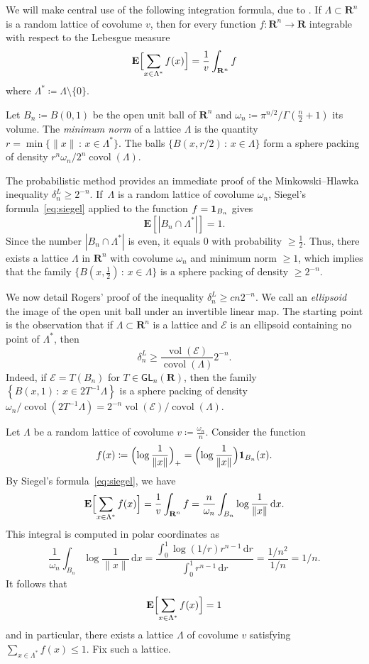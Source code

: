 \documentclass[10pt,a4paper]{amsart}
\newcommand{\R}{\mathbf{R}}
\newcommand{\E}{\mathbf{E}}
\newcommand{\gGL}{\mathsf{GL}}
\DeclareMathOperator{\vol}{vol}
\DeclareMathOperator{\covol}{covol}
\renewcommand{\leq}{\leqslant}
\renewcommand{\geq}{\geqslant}
\begin{document}
We will make central use of the following integration formula, due to \cite{Siegel45}. If $\Lambda \subset \R^n$ is a random lattice of covolume $v$, then for every function $f \colon  \R^n \to \R$ integrable with respect to the Lebesgue measure
\begin{equation} \label{eq:siegel}
\E \Bigl[ \sum_{x \in \Lambda^*} f(x) \Bigr] = \frac{1}{v} \int_{\R^n} f
\end{equation}
where $\Lambda^* \coloneqq \Lambda \setminus \{0\}$.
 
Let $B_n \coloneqq B(0,1)$ be the open unit ball of $\R^n$ and
$\omega_n \coloneqq \pi^{n/2} / \Gamma \left( \frac{n}{2} +1 \right)$ its volume. The \emph{minimum norm} of a lattice $\Lambda$ is the quantity $r = \min \{ \|x\| \, : \, x \in \Lambda^*\}$. The balls $\{B(x,r/2) \, : \, x \in \Lambda \}$ form a sphere packing of density $r^n \omega_n/2^n\covol(\Lambda)$.
 
 
The probabilistic method provides an immediate proof of the Minkowski--Hlawka inequality $\delta_n^L \geq 2^{-n}$. If~$\Lambda$ is a random lattice of covolume $\omega_n$, Siegel's formula~\eqref{eq:siegel} applied to the function $f = {\bf 1}_{B_n}$ gives
\[ \E \left[ |B_n \cap \Lambda^*| \right] = 1. \]
Since the number $|B_n \cap \Lambda^*|$ is even, it equals $0$ with probability $\geq \frac 12$. Thus, there exists a lattice
 $\Lambda$ in $\R^n$ with covolume $\omega_n$ and minimum norm $\geq 1$, which implies that the family $\{ B(x,\frac{1}{2}) \, : \, x \in \Lambda \}$ is a sphere packing of density $\geq 2^{-n}$.
 
We now detail Rogers' proof of the inequality $\delta_n^L \geq cn2^{-n}$. We call an \emph{ellipsoid} the image of the open unit ball under an invertible linear map. The starting point is the observation that if $\Lambda \subset \R^n$ is a lattice and $\mathcal{E}$ is an ellipsoid containing no point of $\Lambda^*$, then
\begin{equation} \label{eq:ellipsoidpacking} \delta_n^L \geq \frac{\vol (\mathcal{E})}{\covol (\Lambda)} 2^{-n}.\end{equation}
Indeed, if $\mathcal{E} = T(B_n)$ for $T \in \gGL_n(\R)$, then the family $\left\{ B(x,1) \, : \, x \in 2 T^{-1}\Lambda \right\}$ is a sphere packing of density $\omega_n/\covol(2T^{-1}\Lambda)=2^{-n}\vol(\mathcal{E})/\covol(\Lambda)$.
 
Let $\Lambda$ be a random lattice of covolume $v \coloneqq \frac{\omega_n}{n}$.
Consider the function
\[ f(x) \coloneqq \Bigl( \log \frac{1}{\|x\|} \Bigr)_+  = \Bigl( \log \frac{1}{\|x\|} \Bigr) {\bf 1}_{B_n}(x).\]
By Siegel's formula~\eqref{eq:siegel}, we have
\[ \E \Bigl[ \sum_{x \in \Lambda^*} f(x) \Bigr] = \frac 1v \int_{\R^n} f = \frac{n}{\omega_n} \int_{B_n} \log \frac{1}{\|x\|} \, \mathrm{d}x.\]
This integral is computed in polar coordinates as
\[ \frac{1}{\omega_n} \int_{B_n} \log \frac{1}{\|x\|} \, \mathrm{d}x = \frac{\int_0^1 \log(1/r)r^{n-1}\,\mathrm{d}r}{\int_0^1 r^{n-1}\,\mathrm{d}r} = \frac{1/n^2}{1/n} = 1/n.\]
It follows that
\[ \E \Bigl[ \sum_{x \in \Lambda^*} f(x) \Bigr] = 1\]
and in particular, there exists a lattice $\Lambda$ of covolume $v$ satisfying $\sum_{x \in \Lambda^*} f(x) \leq 1$. Fix such a lattice.
 
\end{document}
